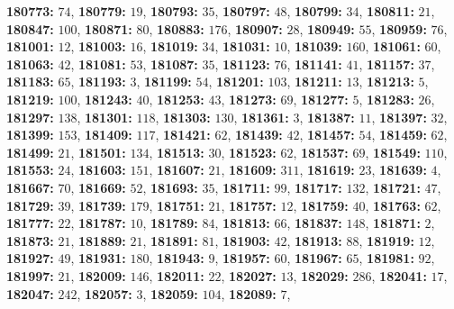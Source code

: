 \textsf{\bfseries 180773:} $74$, \textsf{\bfseries 180779:} $19$, \textsf{\bfseries 180793:} $35$, \textsf{\bfseries 180797:} $48$, \textsf{\bfseries 180799:} $34$, \textsf{\bfseries 180811:} $21$, \textsf{\bfseries 180847:} $100$, \textsf{\bfseries 180871:} $80$, \textsf{\bfseries 180883:} $176$, \textsf{\bfseries 180907:} $28$, \textsf{\bfseries 180949:} $55$, \textsf{\bfseries 180959:} $76$, \textsf{\bfseries 181001:} $12$, \textsf{\bfseries 181003:} $16$, \textsf{\bfseries 181019:} $34$, \textsf{\bfseries 181031:} $10$, \textsf{\bfseries 181039:} $160$, \textsf{\bfseries 181061:} $60$, \textsf{\bfseries 181063:} $42$, \textsf{\bfseries 181081:} $53$, \textsf{\bfseries 181087:} $35$, \textsf{\bfseries 181123:} $76$, \textsf{\bfseries 181141:} $41$, \textsf{\bfseries 181157:} $37$, \textsf{\bfseries 181183:} $65$, \textsf{\bfseries 181193:} $3$, \textsf{\bfseries 181199:} $54$, \textsf{\bfseries 181201:} $103$, \textsf{\bfseries 181211:} $13$, \textsf{\bfseries 181213:} $5$, \textsf{\bfseries 181219:} $100$, \textsf{\bfseries 181243:} $40$, \textsf{\bfseries 181253:} $43$, \textsf{\bfseries 181273:} $69$, \textsf{\bfseries 181277:} $5$, \textsf{\bfseries 181283:} $26$, \textsf{\bfseries 181297:} $138$, \textsf{\bfseries 181301:} $118$, \textsf{\bfseries 181303:} $130$, \textsf{\bfseries 181361:} $3$, \textsf{\bfseries 181387:} $11$, \textsf{\bfseries 181397:} $32$, \textsf{\bfseries 181399:} $153$, \textsf{\bfseries 181409:} $117$, \textsf{\bfseries 181421:} $62$, \textsf{\bfseries 181439:} $42$, \textsf{\bfseries 181457:} $54$, \textsf{\bfseries 181459:} $62$, \textsf{\bfseries 181499:} $21$, \textsf{\bfseries 181501:} $134$, \textsf{\bfseries 181513:} $30$, \textsf{\bfseries 181523:} $62$, \textsf{\bfseries 181537:} $69$, \textsf{\bfseries 181549:} $110$, \textsf{\bfseries 181553:} $24$, \textsf{\bfseries 181603:} $151$, \textsf{\bfseries 181607:} $21$, \textsf{\bfseries 181609:} $311$, \textsf{\bfseries 181619:} $23$, \textsf{\bfseries 181639:} $4$, \textsf{\bfseries 181667:} $70$, \textsf{\bfseries 181669:} $52$, \textsf{\bfseries 181693:} $35$, \textsf{\bfseries 181711:} $99$, \textsf{\bfseries 181717:} $132$, \textsf{\bfseries 181721:} $47$, \textsf{\bfseries 181729:} $39$, \textsf{\bfseries 181739:} $179$, \textsf{\bfseries 181751:} $21$, \textsf{\bfseries 181757:} $12$, \textsf{\bfseries 181759:} $40$, \textsf{\bfseries 181763:} $62$, \textsf{\bfseries 181777:} $22$, \textsf{\bfseries 181787:} $10$, \textsf{\bfseries 181789:} $84$, \textsf{\bfseries 181813:} $66$, \textsf{\bfseries 181837:} $148$, \textsf{\bfseries 181871:} $2$, \textsf{\bfseries 181873:} $21$, \textsf{\bfseries 181889:} $21$, \textsf{\bfseries 181891:} $81$, \textsf{\bfseries 181903:} $42$, \textsf{\bfseries 181913:} $88$, \textsf{\bfseries 181919:} $12$, \textsf{\bfseries 181927:} $49$, \textsf{\bfseries 181931:} $180$, \textsf{\bfseries 181943:} $9$, \textsf{\bfseries 181957:} $60$, \textsf{\bfseries 181967:} $65$, \textsf{\bfseries 181981:} $92$, \textsf{\bfseries 181997:} $21$, \textsf{\bfseries 182009:} $146$, \textsf{\bfseries 182011:} $22$, \textsf{\bfseries 182027:} $13$, \textsf{\bfseries 182029:} $286$, \textsf{\bfseries 182041:} $17$, \textsf{\bfseries 182047:} $242$, \textsf{\bfseries 182057:} $3$, \textsf{\bfseries 182059:} $104$, \textsf{\bfseries 182089:} $7$, 
